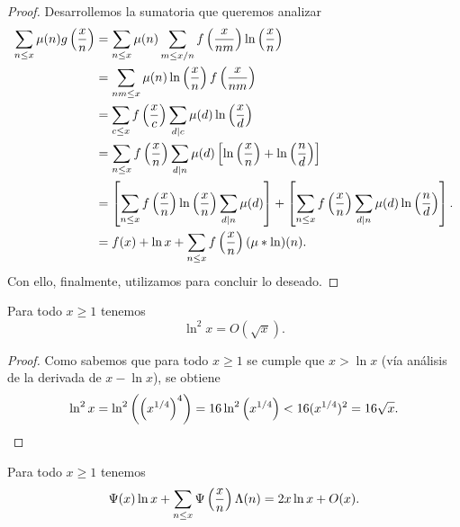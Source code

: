 \begin{proof}
  Desarrollemos la sumatoria que queremos analizar
  \begin{align*}
    \sum_{n \leq x} \mu(n) g\left( \frac{x}{n} \right)
    &= \sum_{n \leq x} \mu(n)
    \sum_{m \leq x/n} f\left( \frac{x}{nm} \right) \ln \left( \frac{x}{n} \right) \\
    &= \sum_{nm \leq x} \mu(n) \ln\left( \frac{x}{n} \right) f \left( \frac{x}{nm} \right) \\
    &= \sum_{c \leq x} f\left( \frac{x}{c} \right)
    \sum_{d \mid c} \mu(d) \ln\left( \frac{x}{d} \right) \\
    &= \sum_{n \leq x} f\left( \frac{x}{n} \right)
    \sum_{d \mid n} \mu(d)
    \left[ \ln \left( \frac{x}{n} \right) + \ln\left( \frac{n}{d} \right) \right] \\
    &= \left[ \sum_{n \leq x} f\left( \frac{x}{n} \right) \ln\left( \frac{x}{n} \right) \sum_{d \mid n} \mu(d) \right]
    +  \left[ \sum_{n \leq x} f\left( \frac{x}{n} \right) \sum_{d \mid n} \mu(d) \ln\left( \frac{n}{d} \right) \right].\\
    &= f(x) + \ln{x} + \sum_{n \leq x} f\left( \frac{x}{n} \right) (\mu * \ln)(n).
  \end{align*}
  Con ello, finalmente,
  utilizamos  para concluir lo deseado.
\end{proof}

\begin{lemma}
  \label{lem:ln2x-is-sqrtx}
  Para todo \(x \geq 1\) tenemos
  \[
    \ln^2 x = O(\sqrt{x}).
  \]
\end{lemma}

\begin{proof}
  Como sabemos que para todo \(x \geq 1\) se cumple que \(x > \ln x\)
  (v\'ia an\'alisis de la  derivada de \(x - \ln x\)), se obtiene
  \[
    \ln^2 x
    = \ln^2 \left( \left( x^{1/4} \right)^4 \right)
    = 16 \ln^2 \left( x^{1/4} \right)
    < 16 (x^{1/4})^2
    = 16 \sqrt{x}.
  \]
\end{proof}

\begin{lemma}
  \label{lem:psi-2xlnx-ox}
  Para todo \(x \geq 1\) tenemos
  \[
    \Psi(x) \ln x + \sum_{n \leq x}
    \Psi\left( \frac{x}{n} \right)\Lambda(n) = 2x\ln x + O(x).
  \]
\end{lemma}

